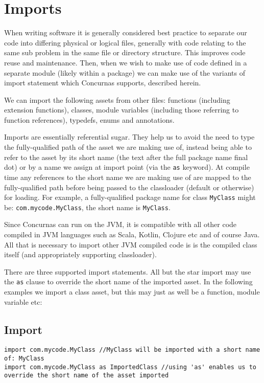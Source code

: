 \documentclass[conc-doc]{subfiles}
\begin{document}
	\chapter[Imports]{Imports}
	\label{chap:imports}

When writing software it is generally considered best practice to separate our code into differing physical or logical files, generally with code relating to the same sub problem in the same file or directory structure. This improves code reuse and maintenance. Then, when we wish to make use of code defined in a separate module (likely within a package) we can make use of the variants of import statement which Concurnas supports, described herein.

We can import the following assets from other files: functions (including extension functions), classes, module variables (including those referring to function references), typedefs, enums and annotations.

Imports are essentially referential sugar. They help us to avoid the need to type the fully-qualified path of the asset we are making use of, instead being able to refer to the asset by its short name (the text after the full package name final dot) or by a name we assign at import point (via the \lstinline{as} keyword). At compile time any references to the short name we are making use of are mapped to the fully-qualified path before being passed to the classloader (default or otherwise) for loading. For example, a fully-qualified package name for class \lstinline{MyClass} might be: \lstinline{com.mycode.MyClass}, the short name is \lstinline{MyClass}.

Since Concurnas can run on the JVM, it is compatible with all other code compiled in JVM languages such as Scala, Kotlin, Clojure etc and of course Java. All that is necessary to import other JVM compiled code is is the compiled class itself (and appropriately supporting classloader).

There are three supported import statements. All but the star import may use the \lstinline{as} clause to override the short name of the imported asset. In the following examples we import a class asset, but this may just as well be a function, module variable etc:

\section{Import}
\begin{lstlisting}
import com.mycode.MyClass //MyClass will be imported with a short name of: MyClass
import com.mycode.MyClass as ImportedClass //using 'as' enables us to override the short name of the asset imported
\end{lstlisting}
\end{document}

